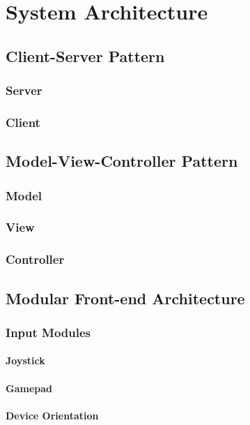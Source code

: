\chapter{System Architecture} \label{systemarchitecture}
\section{Client-Server Pattern} \label{clientserverpattern}
\subsection{Server}
\subsection{Client}
\section{Model-View-Controller Pattern} \label{mvcpattern}
\subsection{Model}
\subsection{View}
\subsection{Controller}
\section{Modular Front-end Architecture}
\subsection{Input Modules}
\subsubsection{Joystick} \label{joystick}
\subsubsection{Gamepad} \label{gamepad}
\subsubsection{Device Orientation} \label{deviceorientation}
